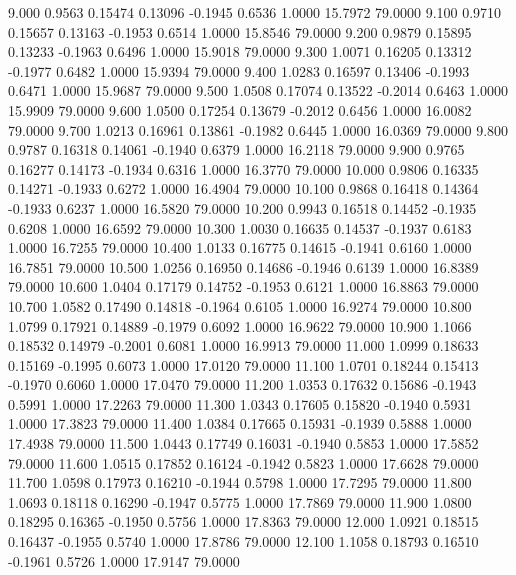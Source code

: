    9.000   0.9563   0.15474   0.13096  -0.1945   0.6536   1.0000  15.7972  79.0000
   9.100   0.9710   0.15657   0.13163  -0.1953   0.6514   1.0000  15.8546  79.0000
   9.200   0.9879   0.15895   0.13233  -0.1963   0.6496   1.0000  15.9018  79.0000
   9.300   1.0071   0.16205   0.13312  -0.1977   0.6482   1.0000  15.9394  79.0000
   9.400   1.0283   0.16597   0.13406  -0.1993   0.6471   1.0000  15.9687  79.0000
   9.500   1.0508   0.17074   0.13522  -0.2014   0.6463   1.0000  15.9909  79.0000
   9.600   1.0500   0.17254   0.13679  -0.2012   0.6456   1.0000  16.0082  79.0000
   9.700   1.0213   0.16961   0.13861  -0.1982   0.6445   1.0000  16.0369  79.0000
   9.800   0.9787   0.16318   0.14061  -0.1940   0.6379   1.0000  16.2118  79.0000
   9.900   0.9765   0.16277   0.14173  -0.1934   0.6316   1.0000  16.3770  79.0000
  10.000   0.9806   0.16335   0.14271  -0.1933   0.6272   1.0000  16.4904  79.0000
  10.100   0.9868   0.16418   0.14364  -0.1933   0.6237   1.0000  16.5820  79.0000
  10.200   0.9943   0.16518   0.14452  -0.1935   0.6208   1.0000  16.6592  79.0000
  10.300   1.0030   0.16635   0.14537  -0.1937   0.6183   1.0000  16.7255  79.0000
  10.400   1.0133   0.16775   0.14615  -0.1941   0.6160   1.0000  16.7851  79.0000
  10.500   1.0256   0.16950   0.14686  -0.1946   0.6139   1.0000  16.8389  79.0000
  10.600   1.0404   0.17179   0.14752  -0.1953   0.6121   1.0000  16.8863  79.0000
  10.700   1.0582   0.17490   0.14818  -0.1964   0.6105   1.0000  16.9274  79.0000
  10.800   1.0799   0.17921   0.14889  -0.1979   0.6092   1.0000  16.9622  79.0000
  10.900   1.1066   0.18532   0.14979  -0.2001   0.6081   1.0000  16.9913  79.0000
  11.000   1.0999   0.18633   0.15169  -0.1995   0.6073   1.0000  17.0120  79.0000
  11.100   1.0701   0.18244   0.15413  -0.1970   0.6060   1.0000  17.0470  79.0000
  11.200   1.0353   0.17632   0.15686  -0.1943   0.5991   1.0000  17.2263  79.0000
  11.300   1.0343   0.17605   0.15820  -0.1940   0.5931   1.0000  17.3823  79.0000
  11.400   1.0384   0.17665   0.15931  -0.1939   0.5888   1.0000  17.4938  79.0000
  11.500   1.0443   0.17749   0.16031  -0.1940   0.5853   1.0000  17.5852  79.0000
  11.600   1.0515   0.17852   0.16124  -0.1942   0.5823   1.0000  17.6628  79.0000
  11.700   1.0598   0.17973   0.16210  -0.1944   0.5798   1.0000  17.7295  79.0000
  11.800   1.0693   0.18118   0.16290  -0.1947   0.5775   1.0000  17.7869  79.0000
  11.900   1.0800   0.18295   0.16365  -0.1950   0.5756   1.0000  17.8363  79.0000
  12.000   1.0921   0.18515   0.16437  -0.1955   0.5740   1.0000  17.8786  79.0000
  12.100   1.1058   0.18793   0.16510  -0.1961   0.5726   1.0000  17.9147  79.0000
